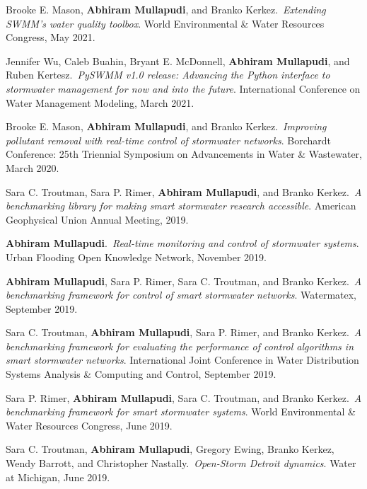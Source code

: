 \documentclass[a4paper,11pt]{article}
\newcommand{\years}[1]{%
  {\reversemarginpar\strut\marginnote{{\small#1}}}%
}
\begin{document}
\years{2021} Brooke E. Mason, \textbf{Abhiram Mullapudi}, and Branko Kerkez.\ \emph{Extending SWMM's water quality toolbox}. World Environmental \& Water Resources Congress, May 2021.\\[.1cm]

\years{2021} Jennifer Wu, Caleb Buahin, Bryant E. McDonnell, \textbf{Abhiram Mullapudi}, and Ruben Kertesz.\ \emph{PySWMM v1.0 release: Advancing the Python interface to stormwater management for now and into the future}. International Conference on Water Management Modeling, March 2021.\\[.1cm]

\years{2020} Brooke E. Mason, \textbf{Abhiram Mullapudi}, and Branko Kerkez.\ \emph{Improving pollutant removal with real-time control of stormwater networks}. Borchardt Conference: 25th Triennial Symposium on Advancements in Water \& Wastewater, March 2020.\\[.1cm]

\years{2019} Sara C. Troutman, Sara P. Rimer, \textbf{Abhiram Mullapudi}, and Branko Kerkez.\ \emph{A benchmarking library for making smart stormwater research accessible}. American Geophysical Union Annual Meeting, 2019.\\[.1cm]

\years{2019} \textbf{Abhiram Mullapudi}.\ \emph{Real-time monitoring and control of stormwater systems}. Urban Flooding Open Knowledge Network, November 2019.\\[.1cm]

\years{2019} \textbf{Abhiram Mullapudi}, Sara P. Rimer, Sara C. Troutman, and Branko Kerkez.\ \emph{A benchmarking framework for control of smart stormwater networks}. Watermatex, September 2019.\\[.1cm]

\years{2019} Sara C. Troutman, \textbf{Abhiram Mullapudi}, Sara P. Rimer, and Branko Kerkez.\ \emph{A benchmarking framework for evaluating the performance of control algorithms in smart stormwater networks}. International Joint Conference in Water Distribution Systems Analysis \& Computing and Control, September 2019.\\[.1cm]

\years{2019} Sara P. Rimer, \textbf{Abhiram Mullapudi}, Sara C. Troutman, and Branko Kerkez.\ \emph{A benchmarking framework for smart stormwater systems}. World Environmental \& Water Resources Congress, June 2019.\\[.1cm]

\years{2019} Sara C. Troutman, \textbf{Abhiram Mullapudi}, Gregory Ewing, Branko Kerkez, Wendy Barrott, and Christopher Nastally.\ \emph{Open-Storm Detroit dynamics}. Water at Michigan, June 2019.\\[.1cm]
\end{document}
